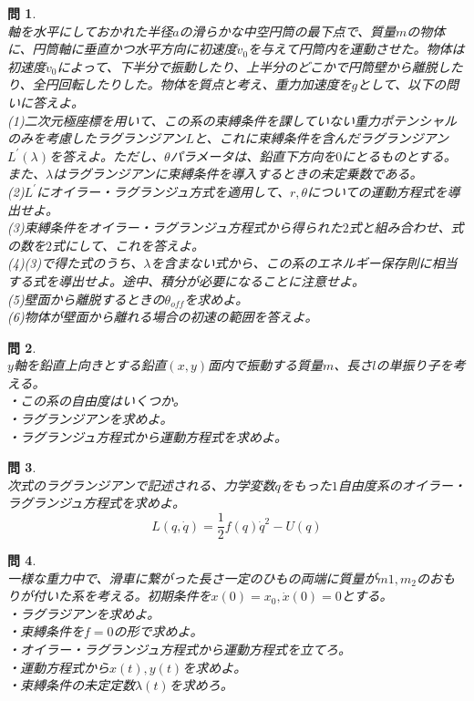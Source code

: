 \documentclass{jsarticle}
\newtheorem{pro}{問}[section]
\begin{document}
\begin{pro}~\\
軸を水平にしておかれた半径\(a\)の滑らかな中空円筒の最下点で、質量\(m\)の物体に、円筒軸に垂直かつ水平方向に初速度\(v_{0}\)を与えて円筒内を運動させた。物体は初速度\(v_{0}\)によって、下半分で振動したり、上半分のどこかで円筒壁から離脱したり、全円回転したりした。物体を質点と考え、重力加速度を\(g\)として、以下の問いに答えよ。\\
(1)二次元極座標を用いて、この系の束縛条件を課していない重力ポテンシャルのみを考慮したラグランジアン\(L\)と、これに束縛条件を含んだラグランジアン\(L^{\prime}(\lambda)\)を答えよ。ただし、\(\theta\)パラメータは、鉛直下方向を\(0\)にとるものとする。また、\(\lambda\)はラグランジアンに束縛条件を導入するときの未定乗数である。\\
(2)\(L^{\prime}\)にオイラー・ラグランジュ方式を適用して、\(r,\theta\)についての運動方程式を導出せよ。\\
(3)束縛条件をオイラー・ラグランジュ方程式から得られた\(2\)式と組み合わせ、式の数を\(2\)式にして、これを答えよ。\\
(4)(3)で得た式のうち、\(\lambda\)を含まない式から、この系のエネルギー保存則に相当する式を導出せよ。途中、積分が必要になることに注意せよ。\\
(5)壁面から離脱するときの\(\theta_{off}\)を求めよ。\\
(6)物体が壁面から離れる場合の初速の範囲を答えよ。
\end{pro}

\begin{pro}~\\
\(y\)軸を鉛直上向きとする鉛直\((x,y)\)面内で振動する質量\(m\)、長さ\(l\)の単振り子を考える。\\
・この系の自由度はいくつか。\\
・ラグランジアンを求めよ。\\
・ラグランジュ方程式から運動方程式を求めよ。
\end{pro}

\begin{pro}~\\
次式のラグランジアンで記述される、力学変数\(q\)をもった\(1\)自由度系のオイラー・ラグランジュ方程式を求めよ。
\[L(q,\dot{q})=\frac{1}{2}f(q){\dot{q}}^{2}-U(q)\]
\end{pro}

\begin{pro}~\\
一様な重力中で、滑車に繋がった長さ一定のひもの両端に質量が\(m{1},m_{2}\)のおもりが付いた系を考える。初期条件を\(x(0)=x_{0},\dot{x}(0)=0\)とする。\\
・ラグラジアンを求めよ。\\
・束縛条件を\(f=0\)の形で求めよ。\\
・オイラー・ラグランジュ方程式から運動方程式を立てろ。\\
・運動方程式から\(x(t),y(t)\)を求めよ。\\
・束縛条件の未定定数\(\lambda(t)\)を求めろ。
\end{pro}
\end{document}
